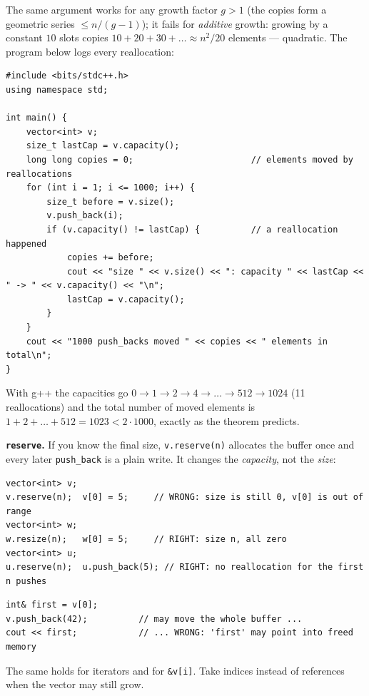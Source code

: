 The same argument works for any growth factor $g > 1$ (the copies form a geometric series $\le n/(g-1)$); it fails for \emph{additive} growth: growing by a constant $10$ slots copies $10 + 20 + 30 + \dots \approx n^2/20$ elements --- quadratic. The program below logs every reallocation:

\begin{lstlisting}[style=cpp]
#include <bits/stdc++.h>
using namespace std;

int main() {
    vector<int> v;
    size_t lastCap = v.capacity();
    long long copies = 0;                       // elements moved by reallocations
    for (int i = 1; i <= 1000; i++) {
        size_t before = v.size();
        v.push_back(i);
        if (v.capacity() != lastCap) {          // a reallocation happened
            copies += before;
            cout << "size " << v.size() << ": capacity " << lastCap << " -> " << v.capacity() << "\n";
            lastCap = v.capacity();
        }
    }
    cout << "1000 push_backs moved " << copies << " elements in total\n";
}
\end{lstlisting}

With g++ the capacities go $0 \to 1 \to 2 \to 4 \to \dots \to 512 \to 1024$ (11 reallocations) and the total number of moved elements is $1 + 2 + \dots + 512 = 1023 < 2 \cdot 1000$, exactly as the theorem predicts.

\textbf{\texttt{reserve}.} If you know the final size, \texttt{v.reserve(n)} allocates the buffer once and every later \texttt{push\_back} is a plain write. It changes the \emph{capacity}, not the \emph{size}:

\begin{warningbox}
\begin{lstlisting}[style=snippet]
vector<int> v;
v.reserve(n);  v[0] = 5;     // WRONG: size is still 0, v[0] is out of range
vector<int> w;
w.resize(n);   w[0] = 5;     // RIGHT: size n, all zero
vector<int> u;
u.reserve(n);  u.push_back(5); // RIGHT: no reallocation for the first n pushes
\end{lstlisting}
\end{warningbox}

\begin{warningbox}
\begin{lstlisting}[style=snippet]
int& first = v[0];
v.push_back(42);          // may move the whole buffer ...
cout << first;            // ... WRONG: 'first' may point into freed memory
\end{lstlisting}
The same holds for iterators and for \texttt{\&v[i]}. Take indices instead of references when the vector may still grow.
\end{warningbox}

